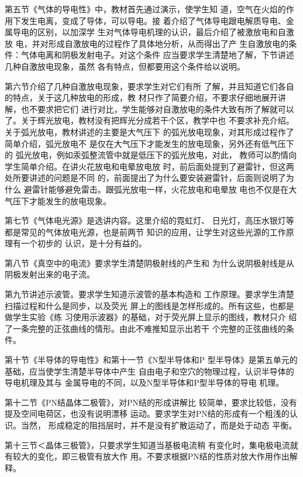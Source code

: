 第五节《气体的导电性》中，教材首先通过演示，使学生知
道，空气在火焰的作用下发生电离，变成了导体，可以导电。接
着介绍了气体导电跟电解质导电、金属导电的区别，以加深学
生对气体导电机理的认识，最后介绍了被激放电和自激放
电，并对形成自激放电的过程作了具体地分析，从而得出了产
生自激放电的条件：气体电离和阴极发射电子。对这个条件
应当要求学生清楚地了解，下节讲述几种自激放电现象，虽然
各有特点，但都要用这个条件给以说明。

第六节介绍了几种自激放电现象，要求学生对它们有所
了解，并且知道它们各自的特点，关于这几种放电的形成，教
材只作了简要介绍，不要求仔细地展开讲解，也不要求把它们
进行对比，学生能够对自激放电的条件大致有所了解就可以
了。关于辉光放电，教材没有把辉光分成若干个区，教学中也
不要求补充介绍。关于弧光放电，教材讲述的主要是大气压下
的弧光放电现象，对其形成过程作了简单介绍，弧光放电不
是仅在大气压下才能发生的放电现象，另外还有低气压下的
弧光放电，例如汞弧整流管中就是低压下的弧光放电，对此，
教师可以酌情向学生简单介绍。在讲火花放电和电晕放电放
时，前后面处提到了避雷针，但这两处所要讲述的问题是不同
的，前面提出了为什么要安装避雷针，后面则说明了为什么
避雷针能够避免雷击。跟弧光放电一样，火花放电和电晕放
电也不仅是在大气压下才能发生的放电现象。

第七节《气体电光源》是选讲内容。这里介绍的霓虹灯、
日光灯，高压水银灯等都是常见的气体放电光源，也是前两节
知识的应用，让学生对这些光源的工作原理有一个初步的
认识，是十分有益的。

第八节《真空中的电流》要求学生清楚阴极射线的产生和
为什么说阴极射线是从阴极发射出来的电子流。

第九节讲述示波管。要求学生知道示波管的基本构造和
工作原理。要求学生清楚扫描过程和什么是同步，以及荧光
屏上的图线是怎样形成的。所有这些，也都是做学生实验《练
习使用示波器》的基础，对于荧光屏上显示的图线，教材只介
绍了一条完整的正弦曲线的情形。由此不难推知显示出若干
个完整的正弦曲线的条件。

第十节《半导体的导电性》和第十一节《N型半导体和P
型半导体》是第五单元的基础，应当使学生清楚半导体中产生
自由电子和空穴的物理过程，认识半导体的导电机理及其与
金属导电的不同，以及N型半导体和P型半导体的导电
机理。

第十二节《PN结晶体二极管》，对PN结的形成讲解比
较简单，要求比较低，没有提及空间电荷区，也没有说明漂移
运动。要求学生对PN结的形成有一个粗浅的认识。当然，
形成稳定的阻挡层时，并不是没有扩散运动了，而是处于动态
平衡。

第十三节＜晶体三极管》，只要求学生知道当基极电流稍
有变化时，集电极电流就有较大的变化，即三极管有放大作
用。不要求根据PN结的性质对放大作用作出解释。

